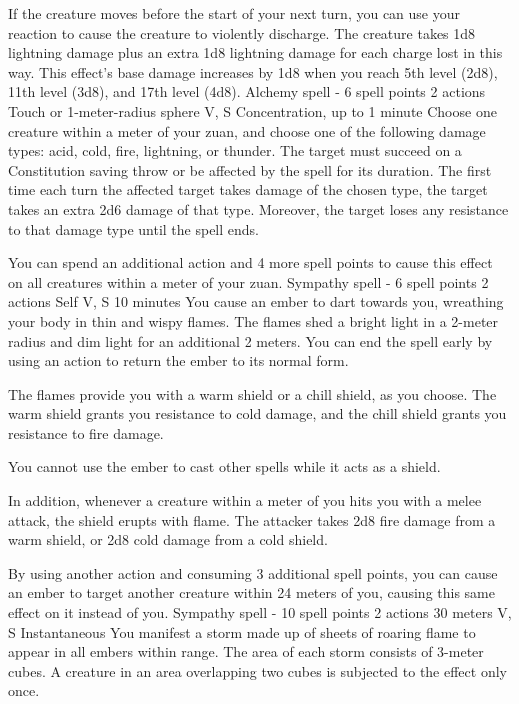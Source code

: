     If the creature moves before the start of your next turn, you can use your reaction to cause the creature to violently discharge.
    The creature takes 1d8 lightning damage plus an extra 1d8 lightning damage for each charge lost in this way.
    This effect's base damage increases by 1d8 when you reach 5th level (2d8), 11th level (3d8), and 17th level (4d8).
    {Alchemy spell - 6 spell points}
    {2 actions}
    {Touch or 1-meter-radius sphere}
    {V, S}
    {Concentration, up to 1 minute}
    Choose one creature within a meter of your zuan, and choose one of the following damage types: acid, cold, fire, lightning, or thunder.
    The target must succeed on a Constitution saving throw or be affected by the spell for its duration.
    The first time each turn the affected target takes damage of the chosen type, the target takes an extra 2d6 damage of that type.
    Moreover, the target loses any resistance to that damage type until the spell ends.

    You can spend an additional action and 4 more spell points to cause this effect on all creatures within a meter of your zuan.
    {Sympathy spell - 6 spell points}
    {2 actions}
    {Self}
    {V, S}
    {10 minutes}
    You cause an ember to dart towards you, wreathing your body in thin and wispy flames.
    The flames shed a bright light in a 2-meter radius and dim light for an additional 2 meters.
    You can end the spell early by using an action to return the ember to its normal form.

    The flames provide you with a warm shield or a chill shield, as you choose.
    The warm shield grants you resistance to cold damage, and the chill shield grants you resistance to fire damage.

    You cannot use the ember to cast other spells while it acts as a shield.

    In addition, whenever a creature within a meter of you hits you with a melee attack, the shield erupts with flame.
    The attacker takes 2d8 fire damage from a warm shield, or 2d8 cold damage from a cold shield.

    By using another action and consuming 3 additional spell points, you can cause an ember to target another creature within 24 meters of you, causing this same effect on it instead of you.
    {Sympathy spell - 10 spell points}
    {2 actions}
    {30 meters}
    {V, S}
    {Instantaneous}
    You manifest a storm made up of sheets of roaring flame to appear in all embers within range.
    The area of each storm consists of 3-meter cubes.
    A creature in an area overlapping two cubes is subjected to the effect only once.

